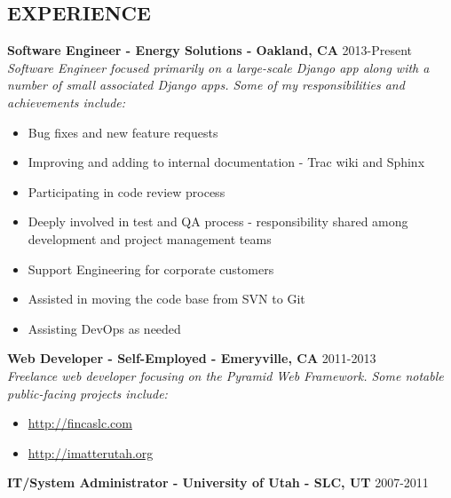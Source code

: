 \documentclass[line,margin]{res}
\begin{document}
\date{\today}
\address{\href{mailto:parker@parkerpinette.com}{parker@parkerpinette.com} \\ (801) 638-8611 \\ \url{https://github.com/ppinette}}

\begin{resume}

\section{EXPERIENCE}
 {\bf Software Engineer - Energy Solutions - Oakland, CA} \hfill 2013-Present\\
 {\sl Software Engineer focused primarily on a large-scale Django app along with a number of small associated Django apps. Some of my responsibilities and achievements include:}
  \begin{itemize} \itemsep -2pt %
  \item Bug fixes and new feature requests
  \item Improving and adding to internal documentation - Trac wiki and Sphinx
 \item Participating in code review process
  \item Deeply involved in test and QA process - responsibility shared among development and project management teams
  \item Support Engineering for corporate customers
  \item Assisted in moving the code base from SVN to Git
  \item Assisting DevOps as needed
  \end{itemize}
 {\bf Web Developer - Self-Employed - Emeryville, CA} \hfill 2011-2013\\
 {\sl Freelance web developer focusing on the Pyramid Web Framework. Some notable public-facing projects include:}
  \begin{itemize} \itemsep -2pt %
  \item \url{http://fincaslc.com}  %
  \item \url{http://imatterutah.org}
  \end{itemize}
 {\bf IT/System Administrator - University of Utah - SLC, UT} \hfill 2007-2011\\

\end{resume}
\end{document}
